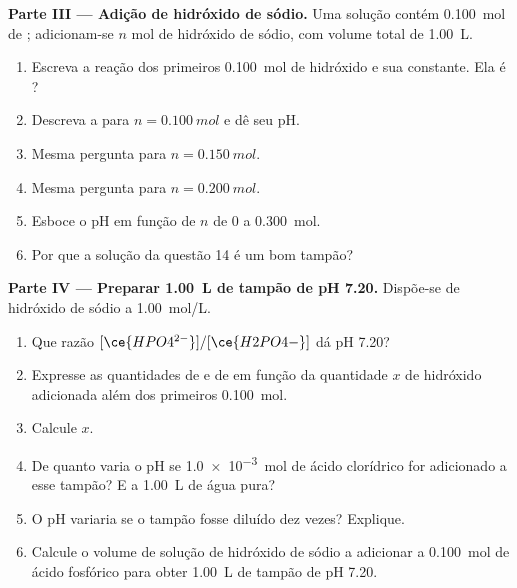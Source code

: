 \begin{problem}
\medskip
\noindent\textbf{Parte III --- Adição de hidróxido de sódio.}
Uma solução contém \qty{0.100}{mol} de ; adicionam-se $n$ mol
de hidróxido de sódio, com volume total de \qty{1.00}{L}.
\begin{enumerate}[resume]
  \item Escreva a reação dos primeiros \qty{0.100}{mol} de hidróxido e sua
        constante. Ela é ?
  \item Descreva a  para $n = \qty{0.100}{mol}$ e dê
        seu pH.
  \item Mesma pergunta para $n = \qty{0.150}{mol}$.
  \item Mesma pergunta para $n = \qty{0.200}{mol}$.
  \item Esboce o pH em função de $n$ de 0 a \qty{0.300}{mol}.
  \item Por que a solução da questão 14 é um bom tampão?
\end{enumerate}

\medskip
\noindent\textbf{Parte IV --- Preparar \qty{1.00}{L} de tampão de pH 7.20.}
Dispõe-se de hidróxido de sódio a \qty{1.00}{mol/L}.
\begin{enumerate}[resume]
  \item Que razão $[\ce{HPO4^{2-}}]/[\ce{H2PO4-}]$ dá pH 7.20?
  \item Expresse as quantidades de  e de  em
        função da quantidade $x$ de hidróxido adicionada além dos
        primeiros \qty{0.100}{mol}.
  \item Calcule $x$.
  \item De quanto varia o pH se \qty{1.0e-3}{mol} de ácido clorídrico
        for adicionado a esse tampão? E a \qty{1.00}{L} de água pura?
  \item O pH variaria se o tampão fosse diluído dez vezes? Explique.
  \item Calcule o volume de solução de hidróxido de sódio a adicionar a
        \qty{0.100}{mol} de ácido fosfórico para obter \qty{1.00}{L} de
        tampão de pH 7.20.
\end{enumerate}
\end{problem}
